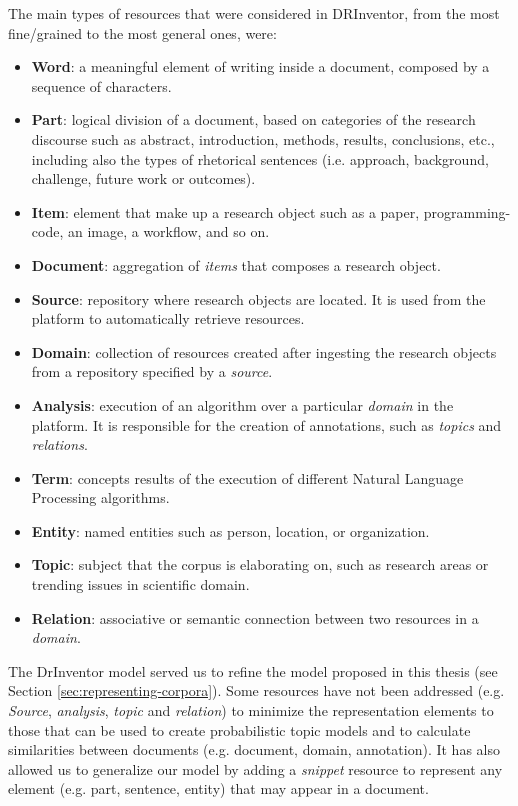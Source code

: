 The main types of resources that were considered in DRInventor, from the most fine/grained to the most general ones, were:
\begin{itemize}
\item \textbf{Word}: a meaningful element of writing inside a document, composed by a sequence of characters.
\item \textbf{Part}: logical division of a document, based on categories of the research discourse such as abstract, introduction, methods, results, conclusions, etc., including also the types of rhetorical sentences \citep{Ronzano2015} (i.e. approach, background, challenge, future work or outcomes).
\item \textbf{Item}: element that make up a research object such as a paper, programming-code, an image, a workflow, and so on.
\item \textbf{Document}: aggregation of \textit{items} that composes a research object.
\item \textbf{Source}: repository where research objects are located. It is used from the platform to automatically retrieve resources.
\item \textbf{Domain}: collection of resources created after ingesting the research objects from a repository specified by a \textit{source}.
\item \textbf{Analysis}: execution of an algorithm over a particular \textit{domain} in the platform. It is responsible for the creation of annotations, such as \textit{topics} and \textit{relations}.
\item \textbf{Term}: concepts results of the execution of different Natural Language Processing algorithms.
\item \textbf{Entity}: named entities such as person, location, or organization.
\item \textbf{Topic}: subject that the corpus is elaborating on, such as research areas or trending issues in scientific domain.
\item \textbf{Relation}: associative or semantic connection between two resources in a \textit{domain}.
\end{itemize}

The DrInventor model served us to refine the model proposed in this thesis (see Section \ref{sec:representing-corpora}). Some resources have not been addressed (e.g. \textit{Source}, \textit{analysis}, \textit{topic} and \textit{relation}) to minimize the representation elements to those that can be used to create probabilistic topic models and to calculate similarities between documents (e.g. document, domain, annotation). It has also allowed us to generalize our model by adding a \textit{snippet} resource to represent any element (e.g. part, sentence, entity) that may appear in a document.


